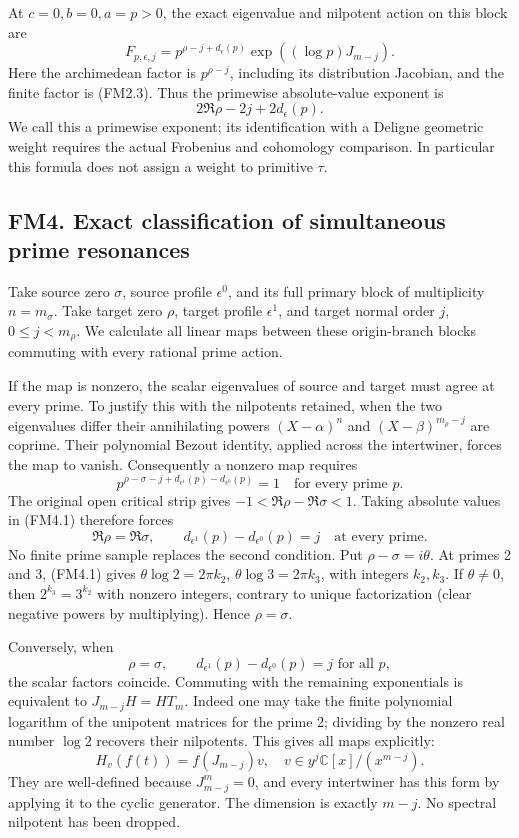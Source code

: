 At \(c=0,b=0,a=p>0\), the exact eigenvalue and nilpotent action on this
block are \[
F_{p,\epsilon,j}
=p^{\rho-j+d_\epsilon(p)}
\exp((\log p)J_{m-j}).
\tag{FM3.3}
\] Here the archimedean factor is \(p^{\rho-j}\), including its
distribution Jacobian, and the finite factor is (FM2.3). Thus the
primewise absolute-value exponent is \[
2\Re\rho-2j+2d_\epsilon(p).
\tag{FM3.4}
\] We call this a primewise exponent; its identification with a Deligne
geometric weight requires the actual Frobenius and cohomology
comparison. In particular this formula does not assign a weight to
primitive \(\tau\).

\subsection{FM4. Exact classification of simultaneous prime
resonances}\label{fm4.-exact-classification-of-simultaneous-prime-resonances}

Take source zero \(\sigma\), source profile \(\epsilon^0\), and its full
primary block of multiplicity \(n=m_\sigma\). Take target zero \(\rho\),
target profile \(\epsilon^1\), and target normal order \(j\),
\(0\le j<m_\rho\). We calculate all linear maps between these
origin-branch blocks commuting with every rational prime action.

If the map is nonzero, the scalar eigenvalues of source and target must
agree at every prime. To justify this with the nilpotents retained, when
the two eigenvalues differ their annihilating powers \((X-\alpha)^n\)
and \((X-\beta)^{m_\rho-j}\) are coprime. Their polynomial Bezout
identity, applied across the intertwiner, forces the map to vanish.
Consequently a nonzero map requires \[
p^{\rho-\sigma-j+d_{\epsilon^1}(p)-d_{\epsilon^0}(p)}=1
\quad\text{for every prime }p.
\tag{FM4.1}
\] The original open critical strip gives \(-1<\Re\rho-\Re\sigma<1\).
Taking absolute values in (FM4.1) therefore forces \[
\Re\rho=\Re\sigma,\qquad
d_{\epsilon^1}(p)-d_{\epsilon^0}(p)=j
\quad\text{at every prime}.
\tag{FM4.2}
\] No finite prime sample replaces the second condition. Put
\(\rho-\sigma=i\theta\). At primes 2 and 3, (FM4.1) gives
\(\theta\log2=2\pi k_2\), \(\theta\log3=2\pi k_3\), with integers
\(k_2,k_3\). If \(\theta\ne0\), then \(2^{k_3}=3^{k_2}\) with nonzero
integers, contrary to unique factorization (clear negative powers by
multiplying). Hence \(\rho=\sigma\).

Conversely, when \[
\boxed{\rho=\sigma,\qquad
d_{\epsilon^1}(p)-d_{\epsilon^0}(p)=j\text{ for all }p,}
\tag{FM4.3}
\] the scalar factors coincide. Commuting with the remaining
exponentials is equivalent to \(J_{m-j}H=HT_m\). Indeed one may take the
finite polynomial logarithm of the unipotent matrices for the prime 2;
dividing by the nonzero real number \(\log2\) recovers their nilpotents.
This gives all maps explicitly: \[
H_v(f(t))=f(J_{m-j})v,
\quad v\in y^j\mathbb C[x]/(x^{m-j}).
\tag{FM4.4}
\] They are well-defined because \(J_{m-j}^m=0\), and every intertwiner
has this form by applying it to the cyclic generator. The dimension is
exactly \(m-j\). No spectral nilpotent has been dropped.

